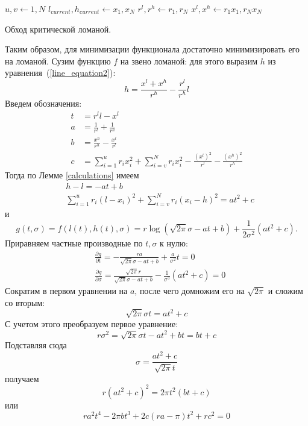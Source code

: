 \documentclass[12pt]{article}
\theoremstyle{definition}
\theoremstyle{plain}
\begin{document}
\begin{algorithm}[H]
\label{algorithm}
\SetAlgoLined
 $u, v \gets 1, N$\;
 $l_{current}, h_{current} \gets x_1, x_N$\;
 $r^l, r^h \gets r_1, r_N$\;
 $x^l, x^h \gets r_1 x_1, r_N x_N$\;
 \caption{Обход критической ломаной.}
\end{algorithm}

Таким образом, для минимизации функционала достаточно минимизировать 
его на ломаной. Сузим функцию $f$ на звено ломаной:
для этого выразим $h$ из уравнения~(\ref{line_equation2}):
$$
h = \frac{x^l + x^h}{r^h} - \frac{r^l}{r^h} l
$$
Введем обозначения:
\begin{align*}
t &= r^l l - x^l \\
a &= \frac{1}{r^l} + \frac{1}{r^h} \\
b &= \frac{x^h}{r^h} - \frac{x^l}{r^l} \\
c &= \sum_{i = 1}^u r_i x_i^2 + \sum_{i = v}^N r_i x_i^2
- \frac{(x^l)^2}{r^l} - \frac{(x^h)^2}{r^h}
\end{align*}
Тогда по Лемме \ref{calculations} имеем
\begin{align*}
& h - l = -a t + b \\
& \sum_{i = 1}^u r_i (l - x_i)^2 + \sum_{i = v}^N r_i (x_i - h)^2 =
a t^2 + c
\end{align*}
и
$$
g(t, \sigma) = f(l(t), h(t), \sigma) = 
r \log \left( \sqrt{2 \pi} \sigma - a t + b \right) +
\frac{1}{2 \sigma^2} \left( a t^2 + c \right).
$$
Приравняем частные производные по $t, \sigma$ к нулю:
\begin{align*}
&\frac{\partial g}{\partial t} = 
- \frac{r a}{\sqrt{2 \pi} \sigma - a t + b} +
\frac{a}{\sigma^2} t = 0\\
& \frac{\partial g}{\partial \sigma} = 
\frac{\sqrt{2 \pi} r}{\sqrt{2 \pi} \sigma - a t + b} -
\frac{1}{\sigma^3} \left( a t^2 + c \right) = 0
\end{align*}
Сократим в первом уравнении на $a$, после чего домножим его на $\sqrt{2 \pi}$ и сложим
со вторым:
$$
\sqrt{2 \pi} \sigma t = a t^2 + c
$$
С учетом этого преобразуем первое уравнение:
$$
r \sigma^2 = \sqrt{2 \pi} \sigma t - a t^2 + bt = bt + c
$$
Подставляя сюда 
$$
\sigma = \frac{a t^2 + c}{\sqrt{2 \pi} t}
$$ 
получаем
$$
r (a t^2 + c)^2 = 2 \pi t^2 (bt + c)
$$
или
$$
r a^2 t^4 - 2 \pi b t^3 + 2 c (r a - \pi) t^2 + r c^2 = 0
$$
\end{document}
